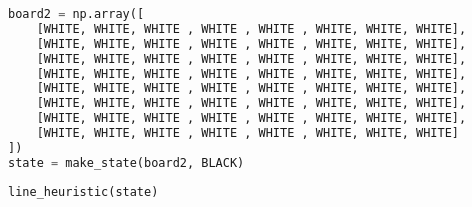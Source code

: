\begin{lstlisting}[language=Python]
board2 = np.array([
    [WHITE, WHITE, WHITE , WHITE , WHITE , WHITE, WHITE, WHITE],
    [WHITE, WHITE, WHITE , WHITE , WHITE , WHITE, WHITE, WHITE],
    [WHITE, WHITE, WHITE , WHITE , WHITE , WHITE, WHITE, WHITE],
    [WHITE, WHITE, WHITE , WHITE , WHITE , WHITE, WHITE, WHITE],
    [WHITE, WHITE, WHITE , WHITE , WHITE , WHITE, WHITE, WHITE],
    [WHITE, WHITE, WHITE , WHITE , WHITE , WHITE, WHITE, WHITE],
    [WHITE, WHITE, WHITE , WHITE , WHITE , WHITE, WHITE, WHITE],
    [WHITE, WHITE, WHITE , WHITE , WHITE , WHITE, WHITE, WHITE]
])
state = make_state(board2, BLACK)
\end{lstlisting}

\begin{lstlisting}[language=Python]
line_heuristic(state)
\end{lstlisting}
